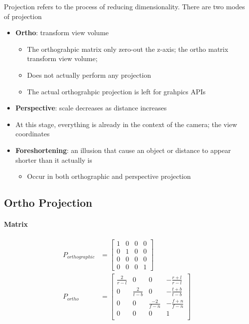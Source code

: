   Projection refers to the process of reducing dimensionality. There are two
  modes of projection

  \begin{itemize}
    \item \textbf{Ortho}: transform view volume
    \begin{itemize}
      \item The orthograhpic matrix only zero-out the z-axis; the ortho matrix
      transform view volume;
      \item Does not actually perform any projection
      \item The actual orthograhpic projection is left for grahpics APIs
    \end{itemize}

    \item \textbf{Perspective}: scale decreases as distance increases
    \item At this stage, everything is already in the context of the camera;
    the view coordinates
    \item \textbf{Foreshortening}: an illusion that cause an object or distance
    to appear shorter than it actually is
    \begin{itemize}
      \item Occur in both orthographic and perspective projection
    \end{itemize}
  \end{itemize}

  \subsection{Ortho Projection}

    \paragraph{Matrix}
    \begin{align}
      P_{orthographic} &=
      \begin{bmatrix}
        1 & 0 & 0 & 0 \\
        0 & 1 & 0 & 0 \\
        0 & 0 & 0 & 0 \\
        0 & 0 & 0 & 1
      \end{bmatrix} \\
      P_{ortho} &=
      \begin{bmatrix}
        \frac{2}{r - l} & 0 & 0 & -\frac{r + l}{r - l} \\
        0 & \frac{2}{t - b} & 0 & -\frac{t + b}{t - b} \\
        0 & 0 & \frac{-2}{f - n} & -\frac{f + n}{f - n} \\
        0 & 0 & 0 & 1 \\
      \end{bmatrix}
    \end{align}

